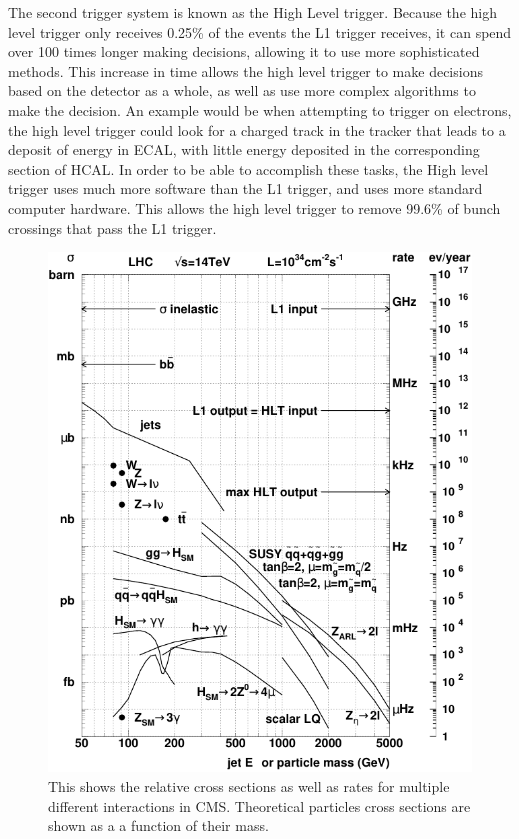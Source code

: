 The second trigger system is known as the High Level trigger. Because the high level trigger only receives 0.25\% of the events the L1 trigger receives, it can spend over 100 times longer making decisions, allowing it to use  more sophisticated methods. This increase in time allows the high level trigger to make decisions based on the detector as a whole, as well as use more complex algorithms to make the decision. An example would be when attempting to trigger on electrons, the high level trigger could look for a charged track in the tracker that leads to a deposit of energy in ECAL, with little energy deposited in the corresponding section of HCAL. In order to be able to accomplish these tasks, the High level trigger uses much more software than the L1 trigger, and uses more standard computer hardware. This allows the high level trigger to remove 99.6\% of bunch crossings that pass the L1 trigger. 

\begin{figure}
    \centering
    \includegraphics{figures/ExperimentFigures/rates_lhc.pdf}
    \caption{This shows the relative cross sections as well as rates for multiple different interactions in CMS. Theoretical particles cross sections are shown as a a function of their mass.}
    \label{fig:Rates}
\end{figure}



